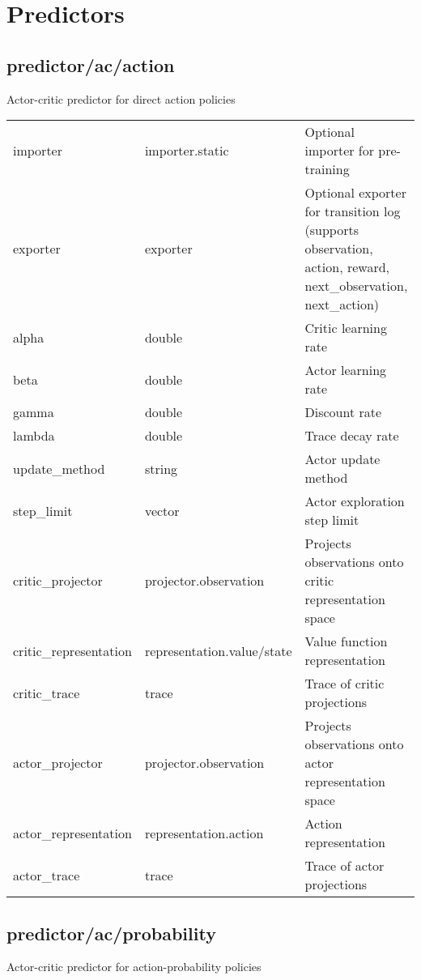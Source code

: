 \section{Predictors}
\subsection{predictor/ac/action}
\noindent Actor-critic predictor for direct action policies\\

\noindent\begin{tabular}{@{}lll@{}}
importer&importer.static&Optional importer for pre-training\\
exporter&exporter&Optional exporter for transition log (supports observation, action, reward, next\_observation, next\_action)\\
alpha&double&Critic learning rate\\
beta&double&Actor learning rate\\
gamma&double&Discount rate\\
lambda&double&Trace decay rate\\
update\_method&string&Actor update method\\
step\_limit&vector&Actor exploration step limit\\
critic\_projector&projector.observation&Projects observations onto critic representation space\\
critic\_representation&representation.value/state&Value function representation\\
critic\_trace&trace&Trace of critic projections\\
actor\_projector&projector.observation&Projects observations onto actor representation space\\
actor\_representation&representation.action&Action representation\\
actor\_trace&trace&Trace of actor projections\\
\end{tabular}
\subsection{predictor/ac/probability}
\noindent Actor-critic predictor for action-probability policies\\

